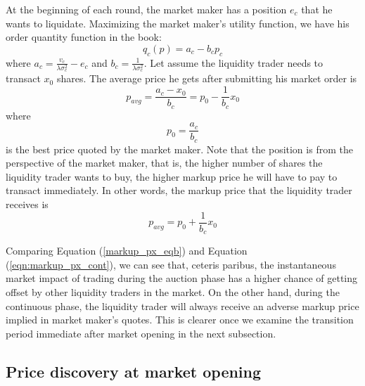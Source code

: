 \documentclass{article}
\begin{document}
At the beginning of each round, the market maker has a position $e_c$ that he wants to liquidate. Maximizing the market maker's utility function, we have his order quantity function in the book:
\begin{equation}\label{eqn:mm_eval_cont}
  q_c(p) = a_c - b_c p_c
\end{equation}
where $a_c = \frac{v_c}{\lambda \sigma_c^2} - e_c$ and $b_c=\frac{1}{\lambda \sigma_c^2}$. Let assume the liquidity trader needs to transact $x_0$ shares. The average price he gets after submitting his market order is
\[
  p_{avg} = \frac{a_c-x_0}{b_c}=p_0 - \frac{1}{b_c} x_0
\]
where
\[
  p_0 = \frac{a_c}{b_c}
\]
is the best price quoted by the market maker. Note that the position is from the perspective of the market maker, that is, the higher number of shares the liquidity trader wants to buy, the higher markup price he will have to pay to transact immediately. In other words, the markup price that the liquidity trader receives is
\begin{equation}\label{eqn:markup_px_cont}
  p_{avg} = p_0 + \frac{1}{b_c} x_0
\end{equation}

Comparing Equation (\ref{markup_px_eqb}) and Equation (\ref{eqn:markup_px_cont}), we can see that, ceteris paribus, the instantaneous market impact of trading during the auction phase has a higher chance of getting offset by other liquidity traders in the market. On the other hand, during the continuous phase, the liquidity trader will always receive an adverse markup price implied in market maker's quotes. This is clearer once we examine the transition period immediate after market opening in the next subsection.

\subsection{Price discovery at market opening}\label{subsec:AnalyticalFrameworkTransitionPeriod}
\end{document}
